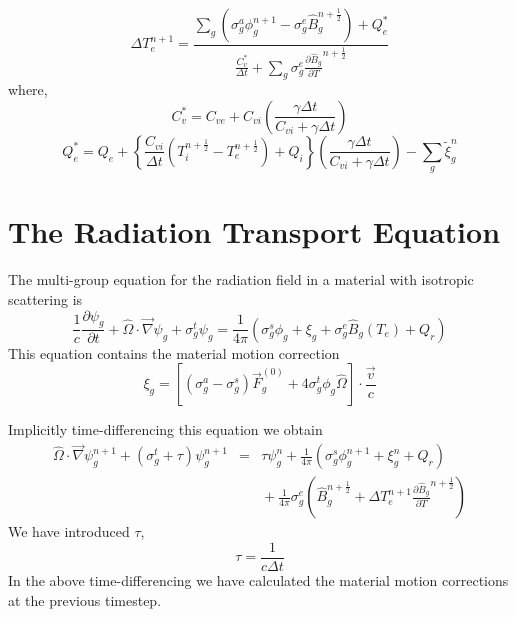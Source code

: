 \documentclass[12pt]{article}
\newcommand{\partl}[2]{\ensuremath{\frac{\partial{#1}}{\partial{#2}}}}\newcommand{\del}{\ensuremath{\vec{\nabla}}}
\newcommand{\dt}{\ensuremath{\Delta t}}
\newcommand{\cviOdt}{\ensuremath{\frac{C_{vi}}{\dt}}}
\newcommand{\Cvs}{\ensuremath{C_{v}^{*}}}
\newcommand{\cvsOdt}{\ensuremath{\frac{\Cvs}{\dt}}}
\newcommand{\Bg}{\ensuremath{\hat{B}_{g}}}
\newcommand{\Bgnphlf}{\ensuremath{\hat{B}_{g}^{n+\frac{1}{2}}}}
\newcommand{\pBgnphlfdT}{\ensuremath{\frac{\partial\hat{B}_{g}}{\partial T}^{n+\frac{1}{2}}}}
\begin{document}
\begin{equation}
   \boxed{
        \Delta T_{e}^{n+1} =
                \frac{\sum_{g} \left( \sigma_{g}^{a} \phi_{g}^{n+1} 
                         - \sigma_{g}^{e} \Bgnphlf \right)
                         + Q_{e}^{*}}
                {\cvsOdt + \sum_{g} \sigma_{g}^{e} \pBgnphlfdT}
         }
\label{eq:Tenp1}
\end{equation}
where,
\begin{equation}
        \Cvs = C_{ve} + C_{vi} \left(\frac{\gamma\dt}{C_{vi}+\gamma\dt}\right)
\end{equation}
\begin{equation}
        Q_{e}^{*} = Q_{e} + \left\{ \cviOdt (T_{i}^{n+\frac{1}{2}} - T_{e}^{n+\frac{1}{2}}) +
                                Q_{i} \right\}
                \left(\frac{\gamma\dt}{C_{vi}+\gamma\dt}\right) -
                \sum_{g} \tilde{\xi}_{g}^{n}
\end{equation}

\section{The Radiation Transport Equation}

The multi-group equation for the radiation field in a material
with isotropic scattering is
\begin{equation}
        \frac{1}{c} \partl{\psi_{g}}{t}
        + \hat{\Omega} \cdot \del \psi_{g}
        + \sigma^{t}_{g} \psi_{g}
        = \frac{1}{4 \pi}
         \left( \sigma^{s}_{g} \phi_{g}
                + \xi_{g}
                + \sigma^{e}_{g} \Bg(T_{e})
                + Q_{r}
         \right)
\label{eq:psi}
\end{equation}
This equation contains the material motion correction
\begin{equation}
        \xi_{g} = \left[ (\sigma^{a}_{g} - \sigma^{s}_{g}) \vec{F}^{(0)}_{g}
                + 4 \sigma^{t}_{g} \phi_{g} \hat{\Omega} \right]
                        \cdot \frac{\vec{v}}{c}
\label{eq:xi}
\end{equation}

Implicitly time-differencing this equation we obtain
\begin{eqnarray}
\hat{\Omega} \cdot \del \psi^{n+1}_{g} + (\sigma^{t}_{g} + \tau) \psi^{n+1}_{g}
        &=&  \tau \psi_{g}^{n}
         + \frac{1}{4\pi} \left( \sigma^{s}_{g} \phi^{n+1}_{g}
        + \xi_{g}^{n} + Q_{r} \right)
  \nonumber \\
    & & \mbox{}
        + \frac{1}{4\pi} \sigma^{e}_{g} 
                \left(\Bgnphlf + \Delta T_{e}^{n+1} \pBgnphlfdT \right)
\label{eq:RadEq1}
\end{eqnarray}
We have introduced $\tau$,
\begin{equation}
        \tau = \frac{1}{c\dt}
\end{equation}
In the above time-differencing
we have calculated the material motion corrections at the previous timestep.
\end{document}
